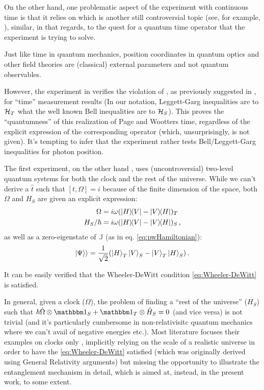 On the other hand, one problematic aspect of the experiment with continuous time
is that
it relies on  which is another
still controversial topic (see, for example, \cite{HawtonPhotonPosition}),
similar, in that regards, to the quest for a quantum time operator that the experiment is trying to solve.

Just like time in quantum mechanics, position coordinates in quantum optics and other field theories
are (classical) external parameters and not quantum observables. 

However, the experiment in \cite{Moreva_position} verifies the violation of
, as previously suggested in \cite{LeggettGarg+PageWootters},
for ``time'' measurement results
(In our notation, Leggett-Garg inequalities are to $\mathcal{H}_T$ what the well known Bell inequalities
  are to $\mathcal{H}_S$).
This proves the ``quantumness'' of this realization of Page and Wootters time,
regardless of the explicit expression of the corresponding operator (which, unsurprisingly,
is not given). It's tempting to infer that the experiment
rather tests Bell/Leggett-Garg inequalities for photon position.

The first experiment, on the other hand \parencite{Moreva:illustration,Moreva:synthetic},
uses (uncontroversial)
two-level quantum systems for both the clock and the rest of the universe.
While we can't derive a $\hat{t}$ such that $[t, \Omega] = i$
because of the finite dimension of the space, both $\Omega$
and $H_S$ are given an explicit expression:
\begin{align}
  \Omega            &= i\omega(\ketbra{H}{V}- \ketbra{V}{H})_T \\
  H_S/{\hbar}       &= i\omega(\ketbra{H}{V}- \ketbra{V}{H})_S
  \,\text{,}
\end{align} 
as well as a zero-eigenstate of $\mathbb{J}$ (as in eq. \ref{eq:pwHamiltonian}):
\begin{equation}
  |\Psi\rangle\rangle = \frac{1}{\sqrt{2}}\qty(\ket{H}_T\ket{V}_S-\ket{V}_T\ket{H}_S)
  \,\text{.}
\end{equation}

It can be easily verified that the Wheeler-DeWitt condition
\eqref{eq:Wheeler-DeWitt} is satisfied.

In general, given a clock ($\Omega$), the problem of finding a
``rest of the universe'' ($H_S$) such that
$\hbar\hat{\Omega}\ox\idop_S + \idop_T\ox\hat{H}_S = 0$
(and vice versa)
is not trivial
(and it's particularly cumbersome in non-relativisitc
quantum mechanics where we can't avail of negative energies etc.).
Most literature focuses their examples on clocks only
\parencite{Prvanovic,RealisticClocks,HarmonicClocks},
implicitly relying on the scale of a realistic universe
in order to have the \eqref{eq:Wheeler-DeWitt} satisfied
(which was originally derived using General Relativity arguments)
but missing the opportunity to illustrate the entanglement mechanism in detail,
which is aimed at, instead, in the present work, to some extent.

